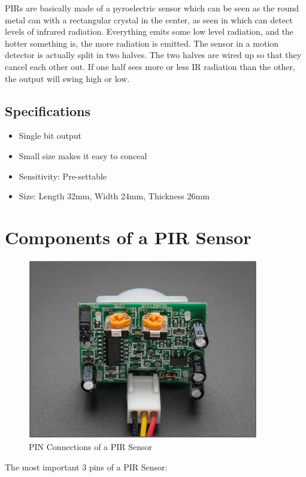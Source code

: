 \documentclass[a4paper,12 pt]{article}
\begin{document}
PIRs are basically made of a pyroelectric sensor which can be seen as the round metal can with a rectangular crystal in the center, as seen in  which can detect levels of infrared radiation. Everything emits some low level radiation, and the hotter something is, the more radiation is emitted. The sensor in a motion detector is actually split in two halves.  The two halves are wired up so that they cancel each other out. If one half sees more or less IR radiation than the other, the output will swing high or low. 

\subsection{Specifications}
\begin{itemize}
\item Single bit output
\item Small size makes it easy to conceal
\item Sensitivity: Pre-settable
\item Size: Length 32mm, Width 24mm, Thickness 26mm

\end{itemize}

\section{Components of a PIR Sensor}
\vspace {5 mm}
\begin{figure}[h]
\begin{center}
\includegraphics[]{PIR_Sensor_pins.png}
\caption{PIN Connections of a PIR Sensor}
\label{fig:3}
\end{center}
\end{figure}


\large The most important 3 pins of a PIR Sensor:
\end{document}
